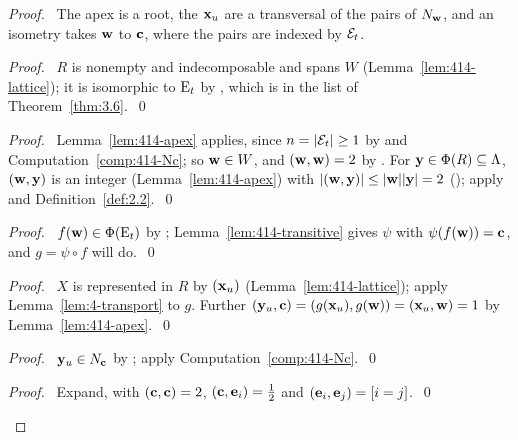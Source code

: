 \begin{proof}
 \pfsketch\ The apex is a root, the ${\mathbf x}_u$ are a transversal of the pairs of $N_{\mathbf w}$, and an
 isometry takes ${\mathbf w}$ to ${\mathbf c}$, where the pairs are indexed by $\mathcal E_t$.
 \begin{proof}\pf\ $R$ is nonempty and indecomposable and spans $W$ (Lemma~\ref{lem:414-lattice});
  it is isomorphic to $\mathrm{E}_t$ by , which is in the list of
  Theorem~\ref{thm:3.6}.~\qed\end{proof}
 \begin{proof}\pf\ Lemma~\ref{lem:414-apex} applies, since $n=|\mathcal E_t|\ge1$ by  and
  Computation~\ref{comp:414-Nc}; so ${\mathbf w}\in W$, and $({\mathbf w},{\mathbf w})=2$ by . For
  ${\mathbf y}\in\Phi(R)\subseteq \Lambda$, $({\mathbf w},{\mathbf y})$ is an integer (Lemma~\ref{lem:414-apex}) with
  $|({\mathbf w},{\mathbf y})|\le|{\mathbf w}||{\mathbf y}|=2$ (); apply  and
  Definition~\ref{def:2.2}.~\qed\end{proof}
 \begin{proof}\pf\ $f({\mathbf w})\in\Phi(\mathrm{E}_t)$ by ; Lemma~\ref{lem:414-transitive}
  gives $\psi$ with $\psi(f({\mathbf w}))={\mathbf c}$, and $g=\psi\circ f$ will do.~\qed\end{proof}
 \begin{proof}\pf\ $X$ is represented in $R$ by $({\mathbf x}_u)$ (Lemma~\ref{lem:414-lattice}); apply
  Lemma~\ref{lem:4-transport} to $g$. Further
  $({\mathbf y}_u,{\mathbf c})=(g({\mathbf x}_u),g({\mathbf w}))=({\mathbf x}_u,{\mathbf w})=1$ by Lemma~\ref{lem:414-apex}.~\qed\end{proof}
 \begin{proof}\pf\ ${\mathbf y}_u\in N_{\mathbf c}$ by ; apply
  Computation~\ref{comp:414-Nc}.~\qed\end{proof}
 \begin{proof}\pf\ Expand, with $({\mathbf c},{\mathbf c})=2$, $({\mathbf c},{\mathbf e}_i)=\frac12$ and
  $({\mathbf e}_i,{\mathbf e}_j)=[i=j]$.~\qed\end{proof}

\end{proof}
